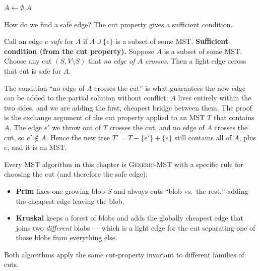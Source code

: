 \begin{algorithm}[H]
\caption{\textsc{Generic-MST}$(G, w)$}
$A \gets \emptyset$\;
\Return $A$\;
\end{algorithm}

How do we find a safe edge? The cut property gives a sufficient condition.

\begin{formalbox}
Call an edge $e$ \emph{safe} for $A$ if $A \cup \{e\}$ is a subset of some MST.
\textbf{Sufficient condition (from the cut property).} Suppose $A$ is a subset of
some MST. Choose any cut $(S, V\setminus S)$ that \emph{no edge of $A$ crosses}.
Then a light edge across that cut is safe for $A$.
\end{formalbox}

The condition ``no edge of $A$ crosses the cut'' is what guarantees the new edge
can be added to the partial solution without conflict: $A$ lives entirely within
the two sides, and we are adding the first, cheapest bridge between them. The
proof is the exchange argument of the cut property applied to an MST $T$ that
contains $A$. The edge $e'$ we throw out of $T$ crosses the cut, and no edge of
$A$ crosses the cut, so $e' \notin A$. Hence the new tree
$T' = T - \{e'\} + \{e\}$ still contains all of $A$, plus $e$, and it is an MST.

\begin{focusbox}
Every MST algorithm in this chapter is \textsc{Generic-MST} with a specific
rule for choosing the cut (and therefore the safe edge):
\begin{itemize}
\item \textbf{Prim} fixes one growing blob $S$ and always cuts ``blob vs.\ the
  rest,'' adding the cheapest edge leaving the blob.
\item \textbf{Kruskal} keeps a forest of blobs and adds the globally cheapest
  edge that joins two \emph{different} blobs --- which is a light edge for the cut
  separating one of those blobs from everything else.
\end{itemize}
Both algorithms apply the same cut-property invariant to different families of cuts.
\end{focusbox}

